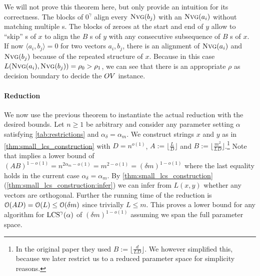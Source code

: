 We will not prove this theorem here, but only provide an intuition for its correctness.
The blocks of $0^\gamma$ align every $\text{\textsc{Nvg}}(b_j)$ with an $\text{\textsc{Nvg}}(a_i)$ without matching multiple \nvgName{}s.
The blocks of zeroes at the start and end of $y$ allow to \enquote{skip} \nvgName{}s of $x$ to align the $B$ \nvgName{}s of $y$ with any consecutive subsequence of $B$ \nvgName{}s of $x$.
If now $\langle a_i, b_j \rangle = 0$ for two vectors $a_i, b_j$, there is an alignment of $\text{\textsc{Nvg}}(a_i)$ and $\text{\textsc{Nvg}}(b_j)$ because of the repeated structure of $x$.
Because in this case $L(\text{\textsc{Nvg}}(a_i), \text{\textsc{Nvg}}(b_j)) = \rho_0 > \rho_1$, we can see that there is an appropriate $\rho$ as decision boundary to decide the $OV$ instance.


\paragraph*{Reduction}
We now use the previous theorem to instantiate the actual reduction with the desired bounds.
Let $n \geq 1$ be arbitrary and consider any parameter setting $\alpha$ satisfying \autoref{tab:restrictions} and $\alpha_\delta = \alpha_m$.
We construct strings $x$ and $y$ as in \autoref{thm:small_lcs_construction} with $D = n^{o(1)}$, $A := \lfloor \frac{L}{D} \rfloor$ and $B := \lfloor \frac{m^2}{LD} \rfloor$.\footnote{In the original paper they used $B := \lfloor \frac{d}{LD} \rfloor$. We however simplified this, because we later restrict us to a reduced parameter space for simplicity reasons.}
Note that \uovh{} implies a lower bound of $(AB)^{1-o(1)} = n^{2\alpha_m - o(1)} = m^{2 - o(1)} = (\delta m)^{1-o(1)}$ where the last equality holds in the current case $\alpha_\delta = \alpha_m$.
By \autoref{thm:small_lcs_construction} (\ref{thm:small_lcs_construction:infer}) we can infer from $L(x,y)$ whether any vectors are orthogonal.
Further the running time of the reduction is $\mathcal{O}(AD) = \mathcal{O}(L) \leq \mathcal{O}(\delta m)$ since trivially $L \leq m$.
This proves a lower bound for any algorithm for $\text{LCS}^\gamma(\mathbb{\alpha})$ of $(\delta m)^{1-o(1)}$ assuming we span the full parameter space.



